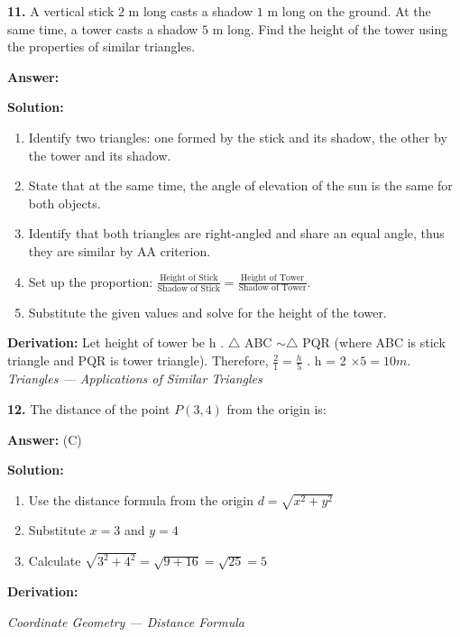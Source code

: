 \documentclass[12pt,a4paper]{exam}
\newcommand{\fitmath}[1]{%
  \sbox{\schmathbox}{$\displaystyle #1$}%
  \ifdim\wd\schmathbox>\linewidth
    \resizebox{\linewidth}{!}{\usebox{\schmathbox}}%
  \else
    \usebox{\schmathbox}%
  \fi}
\begin{document}
\begin{questions}
\question \textbf{11.} A vertical stick $2$ m long casts a shadow $1$ m long on the ground. At the same time, a tower casts a shadow $5$ m long. Find the height of the tower using the properties of similar triangles.

\textbf{Answer:}
\begin{center}
\fitmath{10 \text{meters}}
\end{center}

\textbf{Solution:}
\begin{enumerate}
  \item Identify two triangles: one formed by the stick and its shadow, the other by the tower and its shadow.
  \item State that at the same time, the angle of elevation of the sun is the same for both objects.
  \item Identify that both triangles are right-angled and share an equal angle, thus they are similar by AA criterion.
  \item Set up the proportion: $\frac{\text{Height of Stick}}{\text{Shadow of Stick}} = \frac{\text{Height of Tower}}{\text{Shadow of Tower}}$.
  \item Substitute the given values and solve for the height of the tower.
\end{enumerate}
\textbf{Derivation:}
Let height of tower be  h .  $\triangle$ ABC $\sim \triangle$ PQR  (where  ABC  is stick triangle and  PQR  is tower triangle). Therefore,  $\frac{2}{1} = \frac{h}{5}$ .  h = 2 $\times 5 = 10  m.$
\hfill \textit{Triangles — Applications of Similar Triangles}
\vspace{0.3cm}

\question \textbf{12.} The distance of the point $P(3, 4)$ from the origin is:

\textbf{Answer:}
(C)

\textbf{Solution:}
\begin{enumerate}
  \item Use the distance formula from the origin $d = \sqrt{x^2 + y^2}$
  \item Substitute $x=3$ and $y=4$
  \item Calculate $\sqrt{3^2 + 4^2} = \sqrt{9 + 16} = \sqrt{25} = 5$
\end{enumerate}
\textbf{Derivation:}
\begin{center}
\fitmath{d = \sqrt{3^2 + 4^2} = \sqrt{9+16} = \sqrt{25} = 5}
\end{center}
\hfill \textit{Coordinate Geometry — Distance Formula}
\vspace{0.3cm}


\end{questions}
\end{document}
